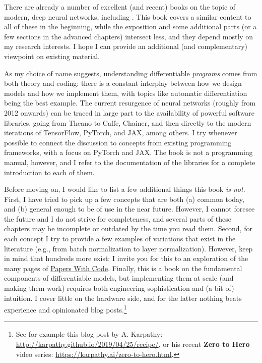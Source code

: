 There are already a number of excellent (and recent) books on the topic of modern, deep neural networks, including \cite{prince2023understanding, zhang2023dive,bishop2024deep,fleuret2023little,hardt2022patterns}. This book covers a similar content to all of these in the beginning, while the exposition and some additional parts (or a few sections in the advanced chapters) intersect less, and they depend mostly on my research interests. I hope I can provide an additional (and complementary) viewpoint on existing material.


As my choice of name suggests, understanding differentiable \textit{programs} comes from both theory and coding: there is a constant interplay between how we design models and how we implement them, with topics like automatic differentiation being the best example. The current resurgence of neural networks (roughly from 2012 onwards) can be traced in large part to the availability of powerful software libraries, going from Theano \cite{al2016theano} to Caffe, Chainer, and then directly to the modern iterations of TensorFlow, PyTorch, and JAX, among others. I try whenever possible to connect the discussion to concepts from existing programming frameworks, with a focus on PyTorch and JAX. The book is not a programming manual, however, and I refer to the documentation of the libraries for a complete introduction to each of them. 

Before moving on, I would like to list a few additional things this book \textit{is not}. First, I have tried to pick up a few concepts that are both (a) common today, and (b) general enough to be of use in the near future. However, I cannot foresee the future and I do not strive for completeness, and several parts of these chapters may be incomplete or outdated by the time you read them. Second, for each concept I try to provide a few examples of variations that exist in the literature (e.g., from batch normalization to layer normalization). However, keep in mind that hundreds more exist: I invite you for this to an exploration of the many pages of \href{http://paperswithcode.com}{Papers With Code}. Finally, this is a book on the fundamental components of differentiable models, but implementing them at scale (and making them work) requires both engineering sophistication and (a bit of) intuition. I cover little on the hardware side, and for the latter nothing beats experience and opinionated blog posts.\footnote{See for example this blog post by A. Karpathy: \url{http://karpathy.github.io/2019/04/25/recipe/}, or his recent \textbf{Zero to Hero} video series: \url{https://karpathy.ai/zero-to-hero.html}.}

